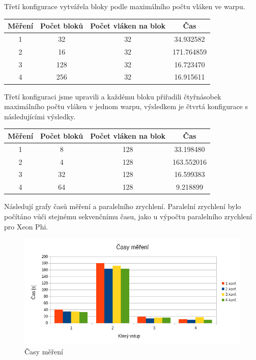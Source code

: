 \documentclass[12pt]{article}
\begin{document}
Třetí konfigurace vytvářela bloky podle maximálního počtu vláken ve warpu.
\begin{center}
\begin{tabular}{c | c | c | c}
\textbf{Měření} & \textbf{Počet bloků} & \textbf{Počet vláken na blok} & \textbf{Čas} \\ \hline \hline
1 & 32 & 32 & 34.932582 \\ \hline
2 & 16 & 32 & 171.764859 \\ \hline
3 & 128 & 32 & 16.723470 \\ \hline
4 & 256 & 32 & 16.915611 \\ \hline
\end{tabular}
\end{center}

Třetí konfiguraci jsme upravili a každému bloku přiřadili čtyřnásobek maximálního počtu vláken v jednom warpu,
výsledkem je čtvrtá konfigurace s následujícími výsledky.
\begin{center}
\begin{tabular}{c | c | c | c}
\textbf{Měření} & \textbf{Počet bloků} & \textbf{Počet vláken na blok} & \textbf{Čas} \\ \hline \hline
1 & 8 & 128 & 33.198480 \\ \hline
2 & 4 & 128 & 163.552016 \\ \hline
3 & 32 & 128 & 16.599383 \\ \hline
4 & 64 & 128 & 9.218899 \\ \hline
\end{tabular}
\end{center}

Následují grafy časů měření a paralelního zrychlení.
Paralelní zrychlení bylo počítáno vůči stejnému sekvenčnímu času, jako u výpočtu paralelního zrychlení pro Xeon Phi.
\begin{figure}[H]
  \begin{center}
      \includegraphics[width=14cm]{images/cuda/casy.png}
    \caption{Časy měření}
  \end{center}
\end{figure}
\end{document}
